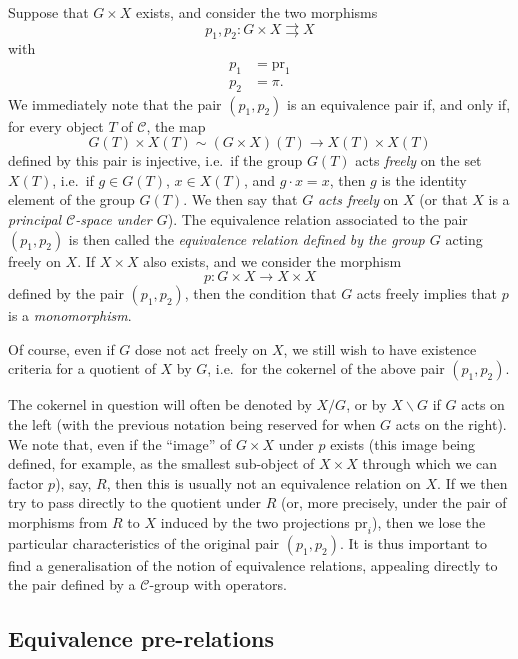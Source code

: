 \documentclass{article}
\newcommand{\oldpage}[1]{\marginpar{\footnotesize$\Big\vert$ \textit{p.~#1}}}
\theoremstyle{definition}
\theoremstyle{definition}
\theoremstyle{definition}
\theoremstyle{definition}
\theoremstyle{remark}
\begin{document}
Suppose that \(G\times X\) exists, and consider the two morphisms
\[
  p_1,p_2\colon G\times X\rightrightarrows X
\]
\oldpage{212-07}with
\[
  \begin{aligned}
    p_1 &= \mathrm{pr}_1
  \\p_2 &= \pi.
  \end{aligned}
\]
We immediately note that the pair \((p_1,p_2)\) is an equivalence pair if, and only if, for every object \(T\) of \({\mathcal{C}}\), the map
\[
  G(T)\times X(T) \sim (G\times X)(T) \to X(T)\times X(T)
\]
defined by this pair is injective, i.e.~if the group \(G(T)\) acts \emph{freely} on the set \(X(T)\), i.e.~if \(g\in G(T)\), \(x\in X(T)\), and \(g\cdot x=x\), then \(g\) is the identity element of the group \(G(T)\).
We then say that \(G\) \emph{acts freely} on \(X\) (or that \(X\) is a \emph{principal \({\mathcal{C}}\)-space under \(G\)}).
The equivalence relation associated to the pair \((p_1,p_2)\) is then called the \emph{equivalence relation defined by the group \(G\)} acting freely on \(X\).
If \(X\times X\) also exists, and we consider the morphism
\[
  p\colon G\times X\to X\times X
\]
defined by the pair \((p_1,p_2)\), then the condition that \(G\) acts freely implies that \(p\) is a \emph{monomorphism}.

Of course, even if \(G\) dose not act freely on \(X\), we still wish to have existence criteria for a quotient of \(X\) by \(G\), i.e.~for the cokernel of the above pair \((p_1,p_2)\).

The cokernel in question will often be denoted by \(X/G\), or by \(X\backslash G\) if \(G\) acts on the left (with the previous notation being reserved for when \(G\) acts on the right).
We note that, even if the ``image'' of \(G\times X\) under \(p\) exists (this image being defined, for example, as the smallest sub-object of \(X\times X\) through which we can factor \(p\)), say, \(R\), then this is usually not an equivalence relation on \(X\).
If we then try to pass directly to the quotient under \(R\) (or, more precisely, under the pair of morphisms from \(R\) to \(X\) induced by the two projections \(\mathrm{pr}_i\)), then we lose the particular characteristics of the original pair \((p_1,p_2)\).
It is thus important to find a generalisation of the notion of equivalence relations, appealing directly to the pair defined by a \({\mathcal{C}}\)-group with operators.

\hypertarget{fga-3-iii-section-4}{%
\subsection{Equivalence pre-relations}\label{fga-3-iii-section-4}}
\end{document}
